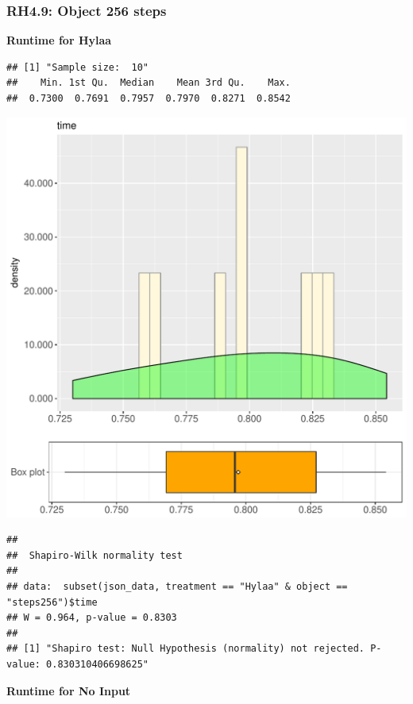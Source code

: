 \documentclass{article}\usepackage[]{graphicx}\usepackage[]{color}
\makeatletter
\def\maxwidth{ %
  \ifdim\Gin@nat@width>\linewidth
    \linewidth
  \else
    \Gin@nat@width
  \fi
}
\newenvironment{kframe}{%
 \def\at@end@of@kframe{}%
 \ifinner\ifhmode%
  \def\at@end@of@kframe{\end{minipage}}%
  \begin{minipage}{\columnwidth}%
 \fi\fi%
 \def\FrameCommand##1{\hskip\@totalleftmargin \hskip-\fboxsep
 \colorbox{shadecolor}{##1}\hskip-\fboxsep
     \hskip-\linewidth \hskip-\@totalleftmargin \hskip\columnwidth}%
 \MakeFramed {\advance\hsize-\width
   \@totalleftmargin\z@ \linewidth\hsize
   \@setminipage}}%
 {\par\unskip\endMakeFramed%
 \at@end@of@kframe}
\newenvironment{knitrout}{}{} %
\makeatother
\begin{document}
\subsubsection{RH4.9: Object 256 steps}

 \textbf{Runtime for Hylaa}
\begin{knitrout}
\color{fgcolor}\begin{kframe}
\begin{verbatim}
## [1] "Sample size:  10"
##    Min. 1st Qu.  Median    Mean 3rd Qu.    Max. 
##  0.7300  0.7691  0.7957  0.7970  0.8271  0.8542
\end{verbatim}
\end{kframe}
\includegraphics[width=\maxwidth]{figure/RH4_Hylaa_steps256-1} 
\begin{kframe}\begin{verbatim}
## 
## 	Shapiro-Wilk normality test
## 
## data:  subset(json_data, treatment == "Hylaa" & object == "steps256")$time
## W = 0.964, p-value = 0.8303
## 
## [1] "Shapiro test: Null Hypothesis (normality) not rejected. P-value: 0.830310406698625"
\end{verbatim}
\end{kframe}
\end{knitrout}
 \textbf{Runtime for No Input}
\end{document}
